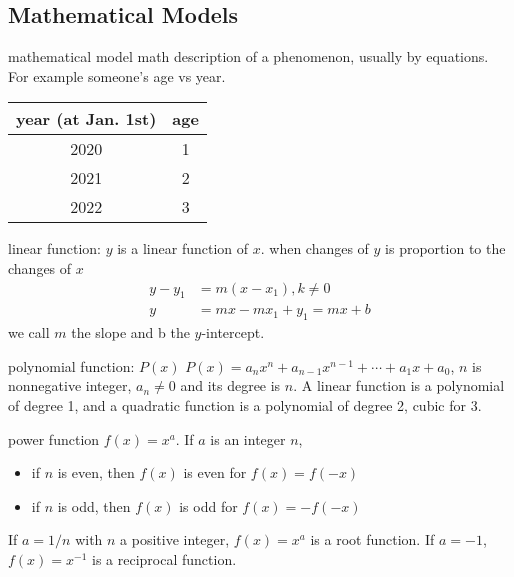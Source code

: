 \documentclass[Calculus 1 Recitation.tex]{subfiles}
\begin{document}
\subsection{Mathematical Models}
\begin{myleftlinebox}
	mathematical model
	\tcblower
	math description of a phenomenon, usually by equations. For example someone's age vs year.
	\begin{center}
		\begin{tabular}{c|c}
			\hline
			year (at Jan. 1st) & age \\\hline
			2020 & 1\\
			2021 & 2\\
			2022 & 3\\
			\hline
		\end{tabular}
	\end{center}
\end{myleftlinebox}

\begin{myleftlinebox}
	linear function: $y$ is a linear function of $x$.
	\tcblower
	when changes of $y$ is proportion to the changes of $x$
	\begin{align*}
		y-y_1 &= m(x-x_1),k\neq 0\\
		y &= mx-mx_1+y_1 = mx+b
	\end{align*}
	we call $m$ the slope and b the $y$-intercept.
\end{myleftlinebox}

\begin{myleftlinebox}
	polynomial function: $P(x)$
	\tcblower
	$P(x) = a_n x^{n}+a_{n-1} x^{n-1}+\cdots+a_1 x + a_0$, $n$ is nonnegative integer, $a_n\neq 0$ and its degree is $n$. A linear function is a polynomial of degree 1, and a quadratic function is a polynomial of degree 2, cubic for 3.
\end{myleftlinebox}

\begin{myleftlinebox}
	power function
	\tcblower
	$f(x) = x^a$. If $a$ is an integer $n$,
	\begin{itemize}
		\item if $n$ is even, then $f(x)$ is even for $f(x)=f(-x)$
		\item if $n$ is odd, then $f(x)$ is odd for $f(x)=-f(-x)$
	\end{itemize}	
	If $a=1/n$ with $n$ a positive integer, $f(x)=x^a$ is a root function. If $a=-1$, $f(x)=x^{-1}$ is a reciprocal function.
\end{myleftlinebox}
\end{document}
